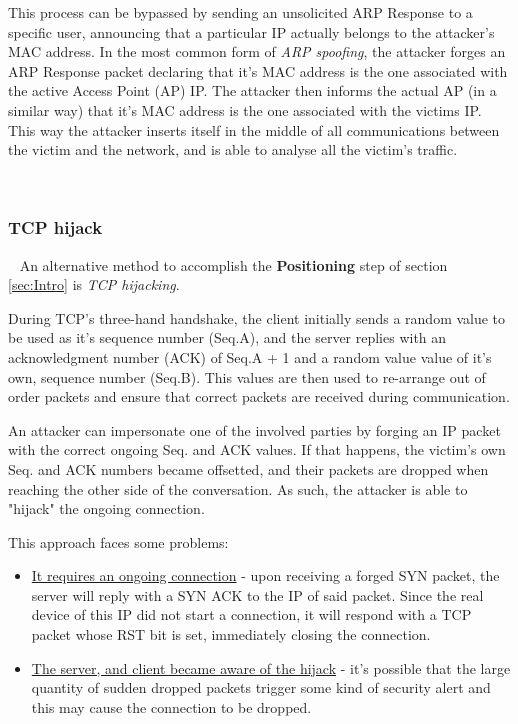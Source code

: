 This process can be bypassed by sending an unsolicited ARP Response to a 
specific user, announcing that a particular IP actually belongs to the 
attacker's MAC address.
In the most common form of \textit{ARP spoofing}, the attacker forges an ARP 
Response packet declaring that it's MAC address is the one associated with the
active Access Point (AP) IP. 
The attacker then informs the actual AP (in a similar way) that it's MAC address
is the one associated with the victims IP.
This way the attacker inserts itself in the middle of all communications 
between the victim and the network, and is able to analyse all the victim's 
traffic.

~
\subsubsection{TCP hijack}

~\newline
An alternative method to accomplish the \textbf{Positioning} step of section
\ref{sec:Intro} is \textit{TCP hijacking}. 

During TCP's three-hand handshake, the client initially sends a random value to
be used as it's sequence number (Seq.A), and the server replies with an 
acknowledgment number (ACK) of Seq.A + 1 and a random value value of it's own, 
sequence number (Seq.B).
This values are then used to re-arrange out of order packets and ensure that 
correct packets are received during communication.

An attacker can impersonate one of the involved parties by forging an IP packet 
with the correct ongoing Seq. and ACK values. 
If that happens, the victim's own Seq. and ACK numbers became offsetted, and 
their packets are dropped when reaching the other side of the conversation.
As such, the attacker is able to "hijack" the ongoing connection.

This approach faces some problems: 
\begin{itemize}
    \item \underline{It requires an ongoing connection} - upon receiving a 
        forged SYN packet, the server will reply with a SYN ACK to the IP of 
        said packet. 
        Since the real device of this IP did not start a connection, it will
        respond with a TCP packet whose RST bit is set, immediately closing the
        connection.

    \item \underline{The server, and client became aware of the 
        hijack} - it's possible that the large quantity of sudden dropped 
        packets trigger some kind of security alert and this may cause the 
        connection to be dropped.
\end{itemize}

